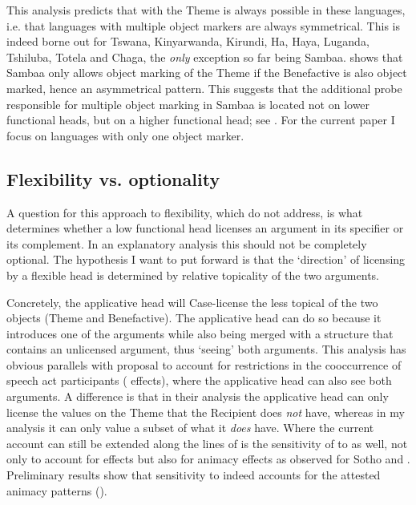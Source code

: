 \documentclass[output=paper]{LSP/langsci}
\begin{document}
This analysis predicts that  with the Theme is always possible in these languages, i.e. that languages with multiple object markers are always symmetrical. This is indeed borne out for Tswana, Kinyarwanda, Kirundi, Ha, Haya, Luganda, Tshiluba, Totela and Chaga, the \textit{only} exception so far being Sambaa. \citet{Riedel2009} shows that Sambaa only allows object marking of the Theme if the Benefactive is also object marked, hence an asymmetrical pattern. This suggests that the additional probe responsible for multiple object marking in Sambaa is located not on lower functional heads, but on a higher functional head; see \citet{VanderWalSubmitted}. 
For the current paper I focus on languages with only one object marker.

\subsection{Flexibility vs. optionality}\label{sec:vdw:3.4}
A question for this approach to flexibility, which \citet{HaddicanHolmberg2012,HaddicanHolmberg2015} do not address, is what determines whether a low functional head licenses an argument in its specifier or its complement. In an explanatory analysis this should not be completely optional. The hypothesis I want to put forward is that the ‘direction’ of licensing by a flexible head is determined by relative topicality of the two arguments. 

Concretely, the applicative head will Case-license the less topical of the two objects (Theme and Benefactive). The applicative head can do so because it introduces one of the arguments while also being merged with a structure that contains an unlicensed argument, thus ‘seeing’ both arguments. This analysis has obvious parallels with  proposal to account for restrictions in the cooccurrence of speech act participants ( effects), where the applicative head can also see both arguments. A difference is that in their analysis the applicative head can only license the  values on the Theme that the Recipient does \textit{not} have, whereas in my analysis it can only value a subset of what it \textit{does} have. Where the current account can still be extended along the lines of  \citet{AdgerHarbour2007} is the sensitivity of  to  as well, not only to account for  effects but also for animacy effects as observed for Sotho \citep{MorolongHyman1977} and  \citep{Zeller2011}. Preliminary results show that sensitivity to  indeed accounts for the attested animacy patterns (\citealt{VanderWal2016}).
\end{document}
